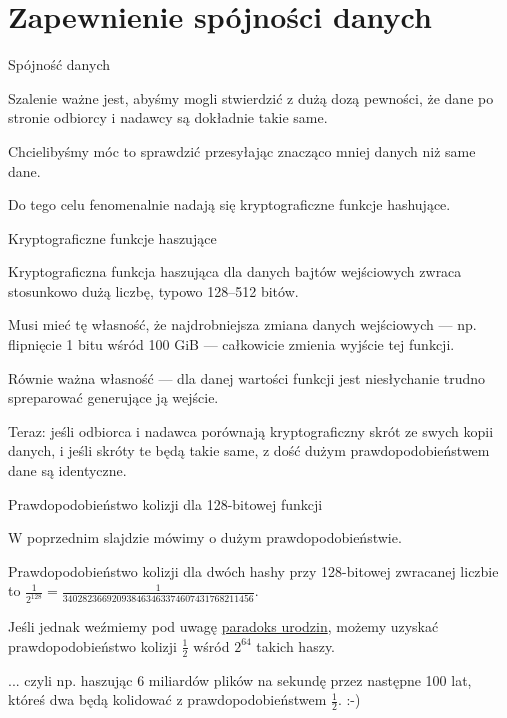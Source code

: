 \section{Zapewnienie spójności danych}

\begin{frame}{Spójność danych}
	
	Szalenie ważne jest, abyśmy mogli stwierdzić z dużą dozą pewności, że dane po stronie odbiorcy i nadawcy są dokładnie takie same.
	
	Chcielibyśmy móc to sprawdzić przesyłając znacząco mniej danych niż same dane.
	
	Do tego celu fenomenalnie nadają się kryptograficzne funkcje hashujące.

\end{frame}

\begin{frame}{Kryptograficzne funkcje haszujące}
	
	Kryptograficzna funkcja haszująca dla danych bajtów wejściowych zwraca stosunkowo dużą liczbę, typowo 128--512 bitów.
	
	Musi mieć tę własność, że najdrobniejsza zmiana danych wejściowych --- np. flipnięcie 1 bitu wśród 100 GiB --- całkowicie zmienia wyjście tej funkcji.
	
	Równie ważna własność --- dla danej wartości funkcji jest niesłychanie trudno spreparować generujące ją wejście.
	
	Teraz: jeśli odbiorca i nadawca porównają kryptograficzny skrót ze swych kopii danych, i jeśli skróty te będą takie same, z dość dużym prawdopodobieństwem dane są identyczne.
	
\end{frame}

\begin{frame}{Prawdopodobieństwo kolizji dla 128-bitowej funkcji}
	
	W poprzednim slajdzie mówimy o dużym prawdopodobieństwie.
	
	Prawdopodobieństwo kolizji dla dwóch hashy przy 128-bitowej zwracanej liczbie to $\frac{1}{2^{128}}=\frac{1}{340282366920938463463374607431768211456}$.
	
	Jeśli jednak weźmiemy pod uwagę \href{http://en.wikipedia.org/wiki/Birthday_problem}{paradoks urodzin}, możemy uzyskać prawdopodobieństwo kolizji $\frac{1}{2}$ wśród $2^{64}$ takich haszy.
	
	... czyli np. haszując 6 miliardów plików na sekundę przez następne 100 lat, któreś dwa będą kolidować z prawdopodobieństwem $\frac{1}{2}$. :-)
	
\end{frame}

